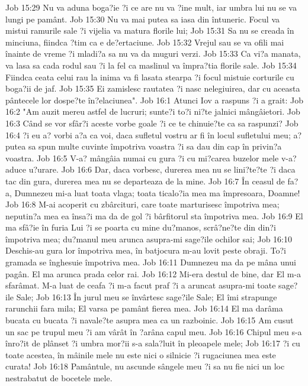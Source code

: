 Job 15:29  Nu va aduna boga?ie ?i ce are nu va ?ine mult, iar umbra lui nu se va lungi pe pamânt.
Job 15:30  Nu va mai putea sa iasa din întuneric. Focul va mistui ramurile sale ?i vijelia va matura florile lui;
Job 15:31  Sa nu se creada în minciuna, fiindca ?tim ca e de?ertaciune.
Job 15:32  Vrejul sau se va ofili mai înainte de vreme ?i mladi?a sa nu va da muguri verzi.
Job 15:33  Ca vi?a manata, va lasa sa cada rodul sau ?i la fel ca maslinul va împra?tia florile sale.
Job 15:34  Fiindca ceata celui rau la inima va fi lasata stearpa ?i focul mistuie corturile cu boga?ii de jaf.
Job 15:35  Ei zamislesc rautatea ?i nasc nelegiuirea, dar cu aceasta pântecele lor dospe?te în?elaciunea".
Job 16:1  Atunci Iov a raspuns ?i a grait:
Job 16:2  "Am auzit mereu astfel de lucruri; sunte?i to?i ni?te jalnici mângâietori.
Job 16:3  Când se vor sfâr?i aceste vorbe goale ?i ce te chinuie?te ca sa raspunzi?
Job 16:4  ?i eu a? vorbi a?a ca voi, daca sufletul vostru ar fi în locul sufletului meu; a? putea sa spun multe cuvinte împotriva voastra ?i sa dau din cap în privin?a voastra.
Job 16:5  V-a? mângâia numai cu gura ?i cu mi?carea buzelor mele v-a? aduce u?urare.
Job 16:6  Dar, daca vorbesc, durerea mea nu se lini?te?te ?i daca tac din gura, durerea mea nu se departeaza de la mine.
Job 16:7  În ceasul de fa?a, Dumnezeu mi-a luat toata vlaga; toata ticalo?ia mea ma împresoara, Doamne!
Job 16:8  M-ai acoperit cu zbârcituri, care toate marturisesc împotriva mea; neputin?a mea ea însa?i ma da de gol ?i bârfitorul sta împotriva mea.
Job 16:9  El ma sfâ?ie în furia Lui ?i se poarta cu mine du?manos, scrâ?ne?te din din?i împotriva mea; du?manul meu arunca asupra-mi sage?ile ochilor sai;
Job 16:10  Deschis-au gura lor împotriva mea, în batjocura m-au lovit peste obraji. To?i gramada se înghesuie împotriva mea.
Job 16:11  Dumnezeu ma da pe mâna unui pagân. El ma arunca prada celor rai.
Job 16:12  Mi-era destul de bine, dar El m-a sfarâmat. M-a luat de ceafa ?i m-a facut praf ?i a aruncat asupra-mi toate sage?ile Sale;
Job 16:13  În jurul meu se învârtesc sage?ile Sale; El îmi strapunge rarunchii fara mila; El varsa pe pamânt fierea mea.
Job 16:14  El ma darâma bucata cu bucata ?i navale?te asupra mea ca un razboinic.
Job 16:15  Am cusut un sac pe trupul meu ?i am vârât în ?arâna capul meu.
Job 16:16  Chipul meu s-a înro?it de plânset ?i umbra mor?ii s-a sala?luit în pleoapele mele;
Job 16:17  ?i cu toate acestea, în mâinile mele nu este nici o silnicie ?i rugaciunea mea este curata!
Job 16:18  Pamântule, nu ascunde sângele meu ?i sa nu fie nici un loc nestrabatut de bocetele mele.
